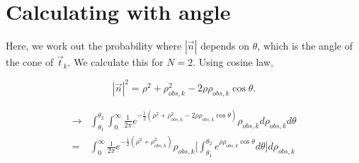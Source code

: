 \documentclass[12pt]{article}
\newcommand{\tjtk}{(\vec{t}_j\cdot\vec{t}_k)}
\begin{document}
\begin{comment}
Using Stirling's approximation $n! \approx \sqrt{2\pi n} (n/e)^n$:

   \begin{align}
   =& \Big\{ {2\pi N}^{1/2}{\Big(\frac{N}{e}\Big)}^N  \Big\} 
      \Big\{ {2\pi\frac{N}{\tjtk+1}}^{-\frac{1}{2}} \Big(\frac{N}{\tjtk+1}\frac{1}{e}\Big)^{-\frac{N}{\tjtk+1}}  \Big\} \\
   \notag & \qquad 
      \Big\{ {2\pi\frac{N\tjtk}{\tjtk+1}}^{-\frac{1}{2}} \Big(\frac{N\tjtk}{\tjtk+1}\frac{1}{e}\Big)^{-\frac{N\tjtk}{\tjtk+1}} \Big\} \tjtk^{-\frac{N}{\tjtk+1}}\\
   =& \frac{(\tjtk+1)^{N+1}}{\sqrt{2\pi N}} (\tjtk)^{-\frac{N\tjtk}{\tjtk+1}-\frac{1}{2}} (\tjtk)^{-\frac{N}{\tjtk+1}} \\
   =& \frac{(\tjtk+1)^{N+1}}{\sqrt{2\pi N}} (\tjtk)^{-\frac{1}{2}} (\tjtk)^{-\frac{N\tjtk -N}{\tjtk+1}}\\
   =& \frac{(\tjtk+1)^{N+1}}{\sqrt{2\pi N \tjtk}} (\tjtk)^{-N}\\
   \approx& \frac{(\tjtk+1)^{N}}{\tjtk} \frac{1}{\sqrt{2\pi N \tjtk}}
   \end{align}
Then:
   \begin{equation}
   \max\Big( \binom{N-1}{n} (\tjtk)^{-n}\Big) \approx \frac{(\tjtk+1)^N}{\sqrt{2\pi(\tjtk)^{3}N}}
   \end{equation}
\end{comment}

\section{Calculating with angle}\label{section:angle}

Here, we work out the probability where $|\vec n|$ depends on $\theta$, which is the angle of the cone of $\vec t_k$. We calculate this for $N=2$. Using cosine law,

	\begin{equation}
	|\vec n|^2 = \rho^2 + \rho^2_{obs,k} - 2\rho\rho_{obs,k}\cos\theta.
	\end{equation}
	
	\begin{align}
	\rightarrow& \int_{\theta_1}^{\theta_2} \int_{0}^{\infty} \frac{1}{2\pi} e^{-\frac{1}{2}(\rho^2 + \rho^2_{obs,k} - 2\rho\rho_{obs,k}\cos\theta)} \rho_{obs,k} d\rho_{obs,k} d\theta \\
	=& \int_{0}^{\infty} \frac{1}{2\pi} e^{-\frac{1}{2}(\rho^2 + \rho^2_{obs,k})}\rho_{obs,k} \Big[\int_{\theta_1}^{\theta_2}e^{\rho\rho_{obs,k}\cos\theta}d\theta \Big]d\rho_{obs,k}
	\label{eqn:expcosx}
	\end{align}
\end{document}
